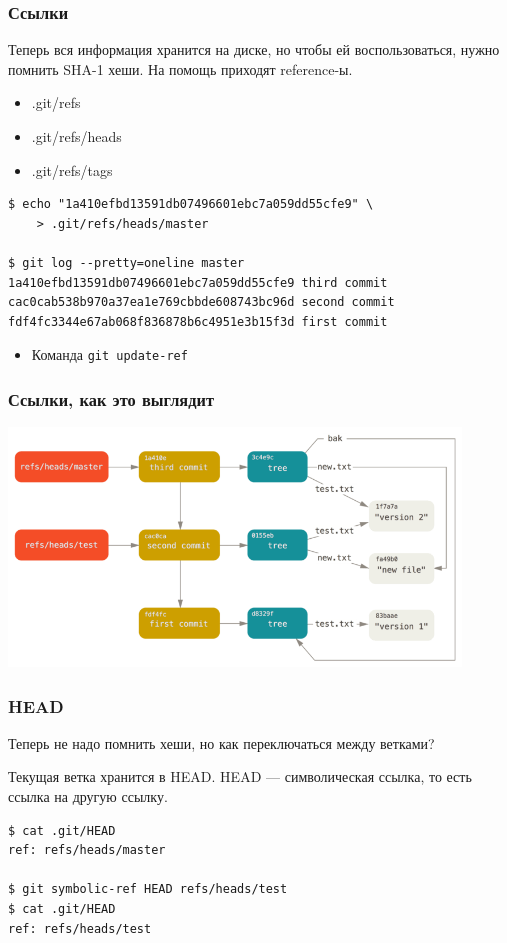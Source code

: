 \documentclass{../text-style}
\begin{document}
    \begin{frame}[fragile]
        \frametitle{Ссылки}
        Теперь вся информация хранится на диске, но чтобы ей воспользоваться, нужно помнить SHA-1 хеши. На помощь приходят reference-ы. 

        \begin{itemize}
            \item .git/refs
            \item .git/refs/heads
            \item .git/refs/tags
        \end{itemize}

        \begin{verbatim}
$ echo "1a410efbd13591db07496601ebc7a059dd55cfe9" \
    > .git/refs/heads/master

$ git log --pretty=oneline master
1a410efbd13591db07496601ebc7a059dd55cfe9 third commit
cac0cab538b970a37ea1e769cbbde608743bc96d second commit
fdf4fc3344e67ab068f836878b6c4951e3b15f3d first commit
        \end{verbatim}
        \begin{itemize}
            \item Команда \verb|git update-ref|
        \end{itemize}
    \end{frame}

    \begin{frame}
        \frametitle{Ссылки, как это выглядит}
        \begin{center}
            \includegraphics[width=0.9\textwidth]{gitRefs.png}
        \end{center}
    \end{frame}

    \begin{frame}[fragile]
        \frametitle{HEAD}
        Теперь не надо помнить хеши, но как переключаться между ветками?

        Текущая ветка хранится в HEAD. HEAD --- символическая ссылка, то есть ссылка на другую ссылку.
        \begin{verbatim}
$ cat .git/HEAD
ref: refs/heads/master

$ git symbolic-ref HEAD refs/heads/test
$ cat .git/HEAD
ref: refs/heads/test
        \end{verbatim}
    \end{frame}
\end{document}
